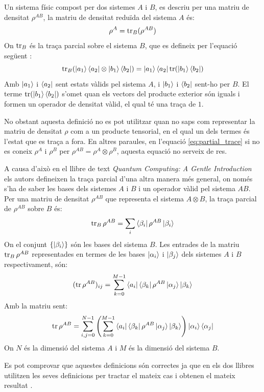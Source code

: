 Un sistema físic compost per dos sistemes $A$ i $B$, es descriu per una matriu de densitat $\rho^{AB}$, la matriu de densitat reduïda del sistema $A$ és:
\begin{equation}
\rho^A = \tr_B(\rho^{AB})
	\label{eq:partial_trace}
\end{equation}
On $\tr_B$ és la traça parcial sobre el sistema $B$, que es defineix per l'equació següent \cite{QCandQI:partial_trace}: 
\begin{equation*}
	\tr_B(\ket{a_1}\bra{a_2}\otimes\ket{b_1}\bra{b_2}) = \ket{a_1}\bra{a_2}\tr(\ket{b_1}\bra{b_2})
\end{equation*}
Amb $\ket{a_1}$ i $\bra{a_2}$ sent estats vàlids pel sistema $A$, i $\ket{b_1}$ i $\bra{b_2}$ sent-ho per $B$. El terme $\tr(\ket{b_1}\bra{b_2})$ s'omet quan els vectors del producte exterior són iguals i formen un operador de densitat vàlid, el qual té una traça de $1$.

No obstant aquesta definició no es pot utilitzar quan no saps com representar la matriu de densitat $\rho$ com a un producte tensorial, en el qual un dels termes és l'estat que es traça a fora. En altres paraules, en l'equació \ref{eq:partial_trace} si no es coneix $\rho^A$ i $\rho^B$ per $\rho^{AB} = \rho^A\otimes\rho^B$, aquesta equació no serveix de res.

A causa d'això en el llibre de text \textit{Quantum Computing: A Gentle Introduction} \cite{QC_intro} els autors defineixen la traça parcial d'una altra manera més general, on només s'ha de saber les bases dels sistemes $A$ i $B$ i un operador vàlid pel sistema $AB$. Per una matriu de densitat $\rho^{AB}$ que representa el sistema $A\otimes B$, la traça parcial de $\rho^{AB}$ sobre $B$ és:
$$
\tr_B \rho^{AB} = \sum_i \bra{\beta_i}\rho^{AB}\ket{\beta_i}
$$
On el conjunt $\{ \ket{\beta_i} \}$ són les bases del sistema $B$. Les entrades de la matriu $\tr_B \rho^{AB}$ representades en termes de les bases ${\ket{\alpha_i}}$ i ${\ket{\beta_j}}$ dels sistemes $A$ i $B$ respectivament, són:
$$
(\tr\rho^{AB})_{ij} = \sum_{k=0}^{M-1} \bra{a_i}\bra{\beta_k}\rho^{AB}\ket{\alpha_j}\ket{\beta_k}
$$
Amb la matriu sent:
$$
\tr\rho^{AB} = 
\sum_{i,j=0}^{N-1}\left(\sum_{k=0}^{M-1} \bra{a_i}\bra{\beta_k}\rho^{AB}\ket{\alpha_j}\ket{\beta_k}\right) \ket{\alpha_i}\bra{\alpha_j}
$$
On $N$ és la dimensió del sistema $A$ i $M$ és la dimensió del sistema $B$. 

Es pot comprovar que aquestes definicions són correctes ja que en els dos llibres utilitzen les seves definicions per tractar el mateix cas i obtenen el mateix resultat \cite{QCandQI:example_partial, QC_intro:example_partial}.

